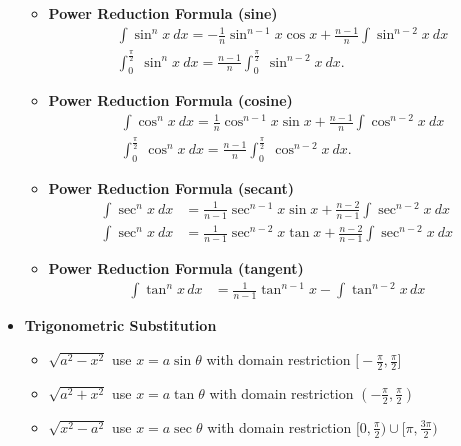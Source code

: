 \documentclass{report}
\begin{document}
\begin{itemize}
\begin{itemize}
                \item \textbf{Power Reduction Formula (sine)}
                    \begin{align*}
                        &\int \sin^{n}{x}\ dx = -\frac{1}{n}\sin^{n-1}{x}\cos{x} + \frac{n-1}{n}\int \sin^{n-2}{x}\ dx \\
                        &\int_{0}^{\frac{\pi}{2}}\ \sin^{n}{x}\ dx = \frac{n-1}{n}\int_{0}^{\frac{\pi}{2}}\ \sin^{n-2}{x}\ dx
                    .\end{align*}
                \item \textbf{Power Reduction Formula (cosine)}
                    \begin{align*}
                        &\int \cos^{n}{x}\ dx = \frac{1}{n}\cos^{n-1}{x}\sin{x} + \frac{n-1}{n}\int \cos^{n-2}{x}\ dx \\
                        &\int_{0}^{\frac{\pi}{2}}\ \cos^{n}{x}\ dx = \frac{n-1}{n}\int_{0}^{\frac{\pi}{2}}\ \cos^{n-2}{x}\ dx
                    .\end{align*}
                \item \textbf{Power Reduction Formula (secant)}
                    \begin{align*}
                        \int \sec^{n}{x}\ dx &= \frac{1}{n-1}\sec^{n-1}{x}\sin{x}+\frac{n-2}{n-1}\int \sec^{n-2}{x}\ dx \\
                        \int \sec^{n}{x}\ dx &= \frac{1}{n-1}\sec^{n-2}{x}\tan{x}+\frac{n-2}{n-1}\int \sec^{n-2}{x}\ dx
                    \end{align*}

                \item \textbf{Power Reduction Formula (tangent)}
                    \begin{align*}
                        \int \tan^n x \, dx &= \frac{1}{n-1} \tan^{n-1}x - \int \tan^{n-2}x \, dx
                    \end{align*}
            \end{itemize}
        \item \textbf{Trigonometric Substitution}
            \begin{itemize}
                \item $\sqrt{a^{2} - x^{2}}$ use $x =a\sin{\theta }$ with domain restriction $\bigg[-\frac{\pi}{2},\frac{\pi}{2}\bigg] $
                \item $\sqrt{a^{2} + x^{2}}$ use $x=a\tan{\theta}$ with domain restriction $\left(-\frac{\pi}{2}, \frac{\pi}{2}\right)$
                \item $\sqrt{x^{2} - a^{2}}$ use $x =a\sec{\theta}$ with domain restriction $\bigg[0,\frac{\pi}{2}\bigg) \cup \bigg[\pi,\frac{3\pi}{2}\bigg)$ 
            \end{itemize}


\end{itemize}
\end{document}
